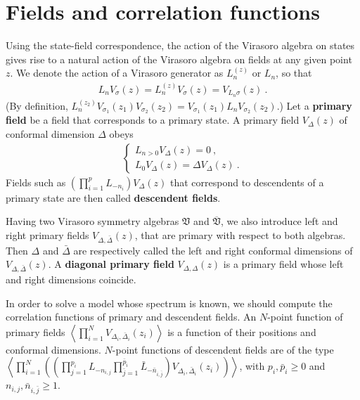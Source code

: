 \documentclass[12pt, a4paper, notitlepage, twoside]{report}
\numberwithin{equation}{section}
\theoremstyle{break}
\begin{document}
\section{Fields and correlation functions \label{secfcf}}

Using the state-field correspondence, the action of the Virasoro algebra on states gives rise to a natural action of the Virasoro algebra on fields at any given point $z$. We denote the action of a Virasoro generator as $L_n^{(z)}$ or $L_n$, so that 
\begin{align}
 L_nV_\sigma(z) = L_n^{(z)}V_\sigma(z) = V_{L_n\sigma}(z)\ .
\label{lnzv}
\end{align}
(By definition, $ L_n^{(z_2)} V_{\sigma_1}(z_1)V_{\sigma_2}(z_2) = V_{\sigma_1}(z_1) L_nV_{\sigma_2}(z_2)$.)
Let a \textbf{\boldmath primary field} be a field that corresponds to a primary state.
A primary field
$V_\Delta(z)$ of conformal dimension $\Delta$ obeys
\begin{align}
\boxed{
 \left\{\begin{array}{l}  L_{n>0} V_\Delta(z) = 0 \ , 
\\
L_0 V_\Delta(z) = \Delta V_\Delta(z) \ .
\end{array}\right. 
}
\label{ldld}
\end{align}
Fields such as  $\left(\prod_{i=1}^p L_{-n_i}\right) V_\Delta(z)$ that correspond to descendents of a primary state are then called  \textbf{descendent fields}.

Having two Virasoro symmetry algebras $\mathfrak{V}$ and $\overline{\mathfrak{V}}$, we also introduce left and right primary fields $V_{\Delta,\bar\Delta}(z)$, that are primary with respect to both algebras. Then $\Delta$ and $\bar\Delta$ are respectively called the left and right conformal dimensions of $V_{\Delta,\bar\Delta}(z)$. A \textbf{diagonal primary field} $V_{\Delta,\Delta}(z)$ is a primary field whose left and right dimensions coincide.

In order to solve a model whose spectrum is known, we should compute the correlation functions of primary and descendent fields.
An $N$-point function of primary fields $\left\langle \prod_{i=1}^N V_{\Delta_i,\bar\Delta_i}(z_i) \right\rangle$ is a function of their positions and conformal dimensions.
$N$-point functions of descendent fields are of the type $\left\langle \prod_{i=1}^N \left(\left(\prod_{j=1}^{p_i} L_{-n_{i,j}}\prod_{\bar j=1}^{\bar p_i} \bar L_{-\bar n_{i,\bar j}}\right)V_{\Delta_i,\bar\Delta_i}(z_i)\right) \right\rangle$, with $p_i,\bar p_i\geq 0$ and $n_{i,j},\bar n_{i,\bar j}\geq 1$. 
\end{document}
